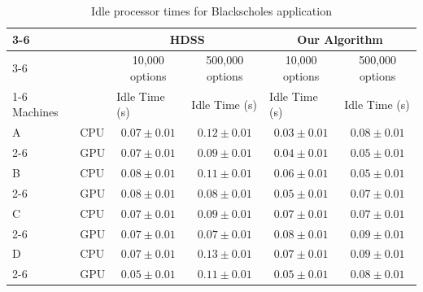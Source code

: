 \documentclass[journal]{IEEEtran}
\begin{document}
\begin{table}[htb]
\centering
\caption{Idle processor times for Blackscholes application}
\begin{scriptsize}
\begin{tabular}{|l|l|l|l|l|l|}
\cline{3-6}
\multicolumn{1}{l}{} &  & \multicolumn{2}{c|}{HDSS} & \multicolumn{2}{c|}{Our Algorithm} \\ 
\cline{3-6}
\multicolumn{1}{l}{} &  & \multicolumn{1}{c|}{10,000 options} & \multicolumn{1}{c|}{500,000 options} & \multicolumn{1}{c|}{10,000 options} & \multicolumn{1}{c|}{500,000 options} \\ 
\cline{1-6}
\multicolumn{1}{|c}{} Machines &  & Idle Time (s) & Idle Time (s) & Idle Time (s) & Idle Time (s) \\ 
\hline
A & CPU & \multicolumn{1}{c|}{$0.07 \pm 0.01$} & \multicolumn{1}{c|}{$0.12 \pm 0.01$} & \multicolumn{1}{c|}{$0.03 \pm 0.01$} & \multicolumn{1}{c|}{$0.08 \pm 0.01$} \\ 
\cline{2-6}
 & GPU & \multicolumn{1}{c|}{$0.07 \pm 0.01$} & \multicolumn{1}{c|}{$0.09 \pm 0.01$} & \multicolumn{1}{c|}{$0.04 \pm 0.01$} & \multicolumn{1}{c|}{$0.05 \pm 0.01$} \\
\hline
B & CPU & \multicolumn{1}{c|}{$0.08 \pm 0.01$} & \multicolumn{1}{c|}{$0.11 \pm 0.01$} & \multicolumn{1}{c|}{$0.06 \pm 0.01$} & \multicolumn{1}{c|}{$0.05 \pm 0.01$} \\ 
\cline{2-6}
 & GPU & \multicolumn{1}{c|}{$0.08 \pm 0.01$} & \multicolumn{1}{c|}{$0.08 \pm 0.01$} & \multicolumn{1}{c|}{$0.05 \pm 0.01$} & \multicolumn{1}{c|}{$0.07 \pm 0.01$} \\ 
\hline
C & CPU & \multicolumn{1}{c|}{$0.07 \pm 0.01$} & \multicolumn{1}{c|}{$0.09 \pm 0.01$} & \multicolumn{1}{c|}{$0.07 \pm 0.01$} & \multicolumn{1}{c|}{$0.07 \pm 0.01$} \\ 
\cline{2-6}
 & GPU & \multicolumn{1}{c|}{$0.07 \pm 0.01$} & \multicolumn{1}{c|}{$0.07 \pm 0.01$} & \multicolumn{1}{c|}{$0.08 \pm 0.01$} & \multicolumn{1}{c|}{$0.09 \pm 0.01$} \\ 
\hline
D & CPU & \multicolumn{1}{c|}{$0.07 \pm 0.01$} & \multicolumn{1}{c|}{$0.13 \pm 0.01$} & \multicolumn{1}{c|}{$0.07 \pm 0.01$} & \multicolumn{1}{c|}{$0.09 \pm 0.01$} \\ 
\cline{2-6}
 & GPU & \multicolumn{1}{c|}{$0.05 \pm 0.01$} & \multicolumn{1}{c|}{$0.11 \pm 0.01$} & \multicolumn{1}{c|}{$0.05 \pm 0.01$} & \multicolumn{1}{c|}{$0.08 \pm 0.01$} \\ 
\hline
\end{tabular}
\end{scriptsize}
\label{table: ociosidadeBlack}
\end{table}
\end{document}
